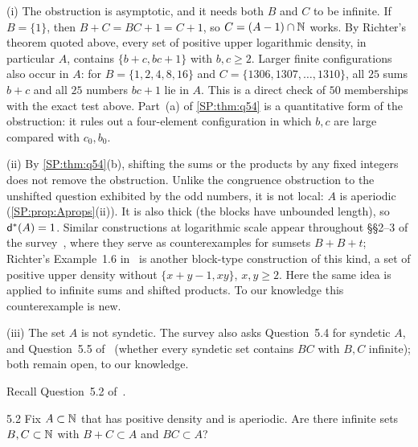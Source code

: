 
\begin{remark}\label{SP:rem:q54}
(i) The obstruction is asymptotic, and it needs both $B$ and $C$ to be infinite. If $B=\{1\}$, then
$B+C=BC+1=C+1$, so $C=(A-1)\cap\mathbb{N}$ works. By Richter's theorem quoted above, every set of positive
upper logarithmic density, in particular $A$, contains $\{b+c,bc+1\}$ with $b,c\ge2$. Larger finite
configurations also occur in $A$: for $B=\{1,2,4,8,16\}$ and $C=\{1306,1307,\dots,1310\}$, all
$25$ sums $b+c$ and all $25$ numbers $bc+1$ lie in $A$. This is a direct check of $50$ memberships
with the exact test above. Part~(a) of \cref{SP:thm:q54} is a quantitative form of the
obstruction: it rules out a four-element configuration in which $b,c$ are large compared with
$c_0,b_0$.

(ii) By \cref{SP:thm:q54}(b), shifting the sums or the products by any fixed integers does not
remove the obstruction. Unlike the congruence obstruction to the unshifted question exhibited by the odd numbers,
it is not local: $A$ is aperiodic (\cref{SP:prop:Aprops}(ii)). It is also thick (the blocks have
unbounded length), so $\mathsf{d}^*(A)=1$. Similar constructions at logarithmic scale appear throughout
\S\S2--3 of the survey~\cite{kra2023problems}, where they serve as counterexamples for sumsets
$B+B+t$; Richter's Example~1.6 in~\cite{richter2025sums} is another block-type construction of
this kind, a set of positive upper density without $\{x+y-1,xy\}$, $x,y\ge2$. Here the same idea is applied
to infinite sums and shifted products. To our knowledge this counterexample is new.

(iii) The set $A$ is not syndetic. The survey also asks Question~5.4 for syndetic $A$, and
Question~5.5 of~\cite{kra2023problems} (whether every syndetic set contains $BC$ with $B,C$ infinite);
both remain open, to our knowledge.
\end{remark}

Recall Question~5.2 of~\cite{kra2023problems}.

\begin{question}{5.2}\label{SP:q:52}
Fix $A\subset\mathbb{N}$ that has positive density and is aperiodic. Are there infinite sets
$B,C\subset\mathbb{N}$ with $B+C\subset A$ and $BC\subset A$?
\end{question}

